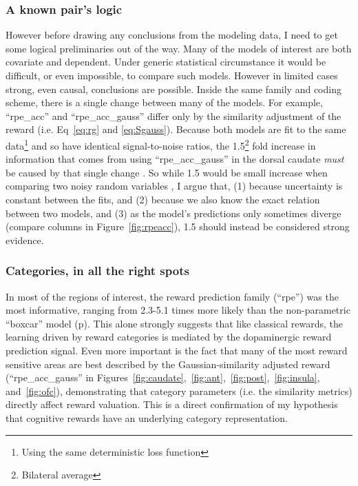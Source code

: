 \documentclass[doc,12pt]{apa}        %
\begin{document}
\subsubsection{A known pair's logic}
\label{subsub:onestep}
However before drawing any conclusions from the modeling data, I need to get some logical preliminaries out of the way.  Many of the models of interest are both covariate and dependent.  Under generic statistical circumstance it would be difficult, or even impossible, to compare such models.  However in limited cases strong, even causal, conclusions are possible.   Inside the same family and coding scheme, there is a single change between many of the models.  For example, ``rpe\_acc'' and ``rpe\_acc\_gauss'' differ only by the similarity adjustment of the reward (i.e. Eq~\ref{eq:rg} and \ref{eq:Sgauss}).  Because both models are fit to the same data\footnote{Using the same deterministic loss function} and so have identical signal-to-noise ratios, the 1.5\footnote{Bilateral average} fold increase in information that comes from using ``rpe\_acc\_gauss'' in the dorsal caudate \emph{must} be caused by that single change \cite{Pearl:2010p9726}.  So while 1.5 would be small increase when comparing two noisy random variables \cite{Anderson:2000p9475,Forster:2000p9623}, I argue that, (1) because uncertainty is constant between the fits, and (2) because we also know the exact relation between two models, and (3) as the model's predictions only sometimes diverge (compare columns in Figure~\ref{fig:rpeacc}), 1.5 should instead be considered strong evidence.

\subsubsection{Categories, in all the right spots}
\label{subsub:rightspots}
In most of the regions of interest, the reward prediction family (``rpe'') was the most informative, ranging from 2.3-5.1 times more likely than the non-parametric ``boxcar'' model (p\pageref{subsub:belowctx}).  This alone strongly suggests that like classical rewards, the learning driven by reward categories is mediated by the dopaminergic reward prediction signal.  Even more important is the fact that many of the most reward sensitive areas are best described by the Gaussian-similarity adjusted reward (``rpe\_acc\_gauss'' in Figures~\ref{fig:caudate},~\ref{fig:ant},~\ref{fig:post},~\ref{fig:insula}, and~\ref{fig:ofc}), demonstrating that category parameters (i.e. the similarity metrics) directly affect reward valuation.  This is a direct confirmation of my hypothesis that cognitive rewards have an underlying category representation.
\end{document}
